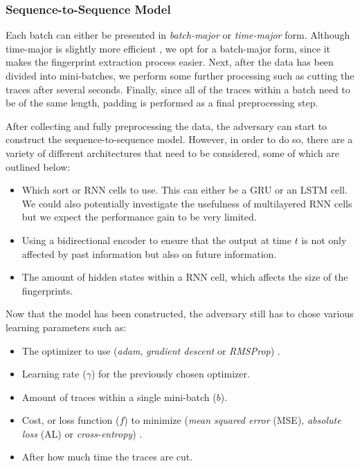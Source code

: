 \subsubsection{Sequence-to-Sequence Model}

Each batch can either be presented in \textit{batch-major} or \textit{time-major} form.
Although time-major is slightly more efficient \cite{tensorflow}, we opt for a batch-major form, since it makes the fingerprint extraction process easier.
Next, after the data has been divided into mini-batches, we perform some further processing such as cutting the traces after several seconds.
Finally, since all of the traces within a batch need to be of the same length, padding is performed as a final preprocessing step.

After collecting and fully preprocessing the data, the adversary can start to construct the sequence-to-sequence model.
However, in order to do so, there are a variety of different architectures that need to be considered, some of which are outlined below:

\begin{itemize}
  \item Which sort or RNN cells to use. This can either be a GRU or an LSTM cell.
    We could also potentially investigate the usefulness of multilayered RNN cells but we expect the performance gain to be very limited.

  \item Using a bidirectional encoder to ensure that the output at time $t$ is not only affected by past information but also on future information.

  \item The amount of hidden states within a RNN cell, which affects the size of the fingerprints.
\end{itemize}

Now that the model has been constructed, the adversary still has to chose various learning parameters such as:

\newpage

\begin{itemize}
  \item The optimizer to use (\textit{adam}, \textit{gradient descent} or \textit{RMSProp}) \cite{tensorflow}.
  \item Learning rate ($\gamma$) for the previously chosen optimizer.
  \item Amount of traces within a single mini-batch ($b$).
  \item Cost, or loss function ($f$) to minimize (\textit{mean squared error} (MSE), \textit{absolute loss} (AL) or \textit{cross-entropy}) \cite{tensorflow}.
  \item After how much time the traces are cut.
\end{itemize}

